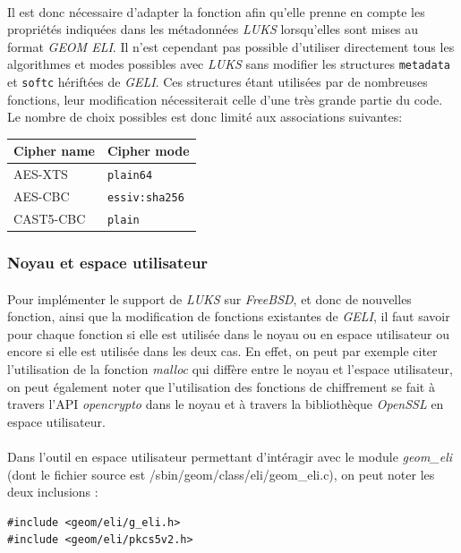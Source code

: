 \paragraph{}
Il est donc nécessaire d'adapter la fonction afin qu'elle prenne en compte les
propriétés indiquées dans les métadonnées \textit{LUKS} lorsqu'elles sont mises
au format \textit{GEOM ELI}. Il n'est cependant pas possible d'utiliser
directement tous les algorithmes et modes possibles avec \textit{LUKS} sans
modifier les structures \texttt{metadata} et \texttt{softc} hériftées de
\textit{GELI}. Ces structures étant utilisées par de nombreuses fonctions, leur
modification nécessiterait celle d'une très grande partie du code. Le nombre de
choix possibles est donc limité aux associations suivantes:
\begin{center}
  \begin{tabular}{ | l | l | }
    \hline
    \textbf{Cipher name} & \textbf{Cipher mode}  \\
    \hline
    AES-XTS              & \texttt{plain64}      \\
    AES-CBC              & \texttt{essiv:sha256} \\
    CAST5-CBC            & \texttt{plain}        \\
    \hline
  \end{tabular}
\end{center}


\subsubsection{Noyau et espace utilisateur}
\paragraph{}
Pour implémenter le support de {\em LUKS} sur {\em FreeBSD}, et donc de nouvelles
fonction, ainsi que la modification de fonctions existantes de {\em GELI}, il
faut savoir pour chaque fonction si elle est utilisée dans le noyau ou en espace
utilisateur ou encore si elle est utilisée dans les deux cas. En effet, on peut
par exemple citer l'utilisation de la fonction {\em malloc} qui diffère entre
le noyau et l'espace utilisateur, on peut également noter que l'utilisation des
fonctions de chiffrement se fait à travers l'API {\em opencrypto} dans le noyau
et à travers la bibliothèque {\em OpenSSL} en espace utilisateur. 

\paragraph{}
Dans l'outil en espace utilisateur permettant d'intéragir avec le module 
{\em geom\_eli} (dont le fichier source est /sbin/geom/class/eli/geom\_eli.c),
on peut noter les deux inclusions :
\begin{lstlisting}
#include <geom/eli/g_eli.h>
#include <geom/eli/pkcs5v2.h>
\end{lstlisting}

